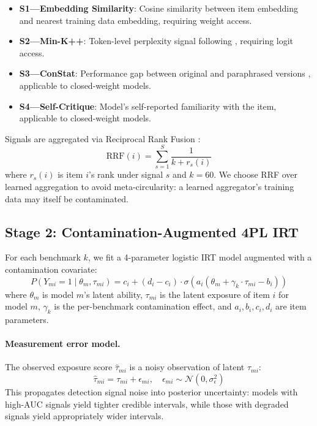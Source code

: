 \documentclass[11pt]{article}
\begin{document}
\begin{itemize}
\item \textbf{S1---Embedding Similarity}: Cosine similarity between item embedding and nearest training data embedding, requiring weight access.
\item \textbf{S2---Min-K++}: Token-level perplexity signal following \citet{shi2024detecting}, requiring logit access.
\item \textbf{S3---ConStat}: Performance gap between original and paraphrased versions \citep{dekoninck2024constat}, applicable to closed-weight models.
\item \textbf{S4---Self-Critique}: Model's self-reported familiarity with the item, applicable to closed-weight models.
\end{itemize}

Signals are aggregated via Reciprocal Rank Fusion \citep[RRF;][]{cormack2009reciprocal}:
\begin{equation}
\text{RRF}(i) = \sum_{s=1}^{S} \frac{1}{k + r_s(i)}
\end{equation}
where $r_s(i)$ is item $i$'s rank under signal $s$ and $k=60$.
We choose RRF over learned aggregation to avoid meta-circularity: a learned aggregator's training data may itself be contaminated.

\subsection{Stage 2: Contamination-Augmented 4PL IRT}

For each benchmark $k$, we fit a 4-parameter logistic IRT model augmented with a contamination covariate:
\begin{equation}
P(Y_{mi} = 1 \mid \theta_m, \tau_{mi}) = c_i + (d_i - c_i) \cdot \sigma\!\left(a_i(\theta_m + \gamma_k \cdot \tau_{mi} - b_i)\right)
\label{eq:4pl}
\end{equation}
where $\theta_m$ is model $m$'s latent ability, $\tau_{mi}$ is the latent exposure of item $i$ for model $m$, $\gamma_k$ is the per-benchmark contamination effect, and $a_i, b_i, c_i, d_i$ are item parameters.

\paragraph{Measurement error model.}
The observed exposure score $\hat{\tau}_{mi}$ is a noisy observation of latent $\tau_{mi}$:
\begin{equation}
\hat{\tau}_{mi} = \tau_{mi} + \epsilon_{mi}, \quad \epsilon_{mi} \sim \mathcal{N}(0, \sigma^2_\epsilon)
\end{equation}
This propagates detection signal noise into posterior uncertainty: models with high-AUC signals yield tighter credible intervals, while those with degraded signals yield appropriately wider intervals.
\end{document}
